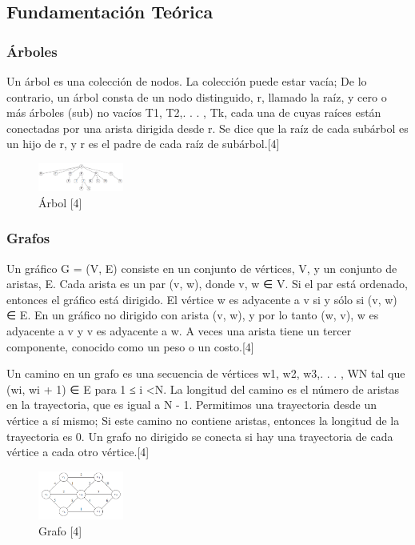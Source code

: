 \documentclass[conference,compsoc]{IEEEtran}
\begin{document}
\subsection{Fundamentación Teórica}
\subsubsection{Árboles}
Un árbol es una colección de nodos. La colección puede estar vacía; De lo contrario, un árbol consta de un nodo distinguido, r, llamado la raíz, y cero o más árboles (sub) no vacíos T1, T2,. . . , Tk, cada una de cuyas raíces están conectadas por una arista dirigida desde r. Se dice que la raíz de cada subárbol es un hijo de r, y r es el padre de cada raíz de subárbol.[4]
\begin{figure}[h]
    \centering
    \includegraphics[width=0.25\textwidth]{Problema2/M1.png}
    \caption{Árbol [4]}
    \label{fig:mesh1}
\end{figure}
\subsubsection{Grafos}
Un gráfico G = (V, E) consiste en un conjunto de vértices, V, y un conjunto de aristas, E. Cada arista es un par (v, w), donde v, w ∈ V. Si el par está ordenado, entonces el gráfico está dirigido. El vértice w es adyacente a v si y sólo si (v, w) ∈ E. En un gráfico no dirigido con arista (v, w), y por lo tanto (w, v), w es adyacente a v y v es adyacente a w. A veces una arista tiene un tercer componente, conocido como un peso o un costo.[4]

Un camino en un grafo es una secuencia de vértices w1, w2, w3,. . . , WN tal que (wi, wi + 1) ∈ E para 1 ≤ i <N. La longitud del camino es el número de aristas en la trayectoria, que es igual a N - 1. Permitimos una trayectoria desde un vértice a sí mismo; Si este camino no contiene aristas, entonces la longitud de la trayectoria es 0. Un grafo no dirigido se conecta si hay una trayectoria de cada vértice a cada otro vértice.[4]

\begin{figure}[h]
    \centering
    \includegraphics[width=0.25\textwidth]{Problema2/M2.png}
    \caption{Grafo [4]}
    \label{fig:mesh1}
\end{figure}
\end{document}
